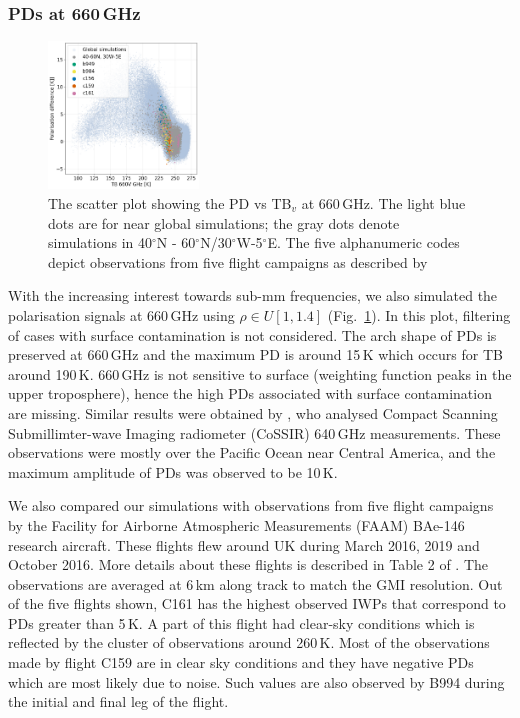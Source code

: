 \documentclass[amt, manuscript]{copernicus}
\begin{document}
\subsubsection{PDs at 660\,GHz}
%
\label{sec:submm_pd}
\begin{figure}[t]
	\includegraphics[width=4cm]{Figures/PD_660.png}
	\caption{The scatter plot showing the PD vs TB$_v$ at 660\,GHz. The light blue dots are for near global simulations; the gray dots denote simulations in 40$^{\circ}$N - 60$^{\circ}$N/30$^{\circ}$W-5$^{\circ}$E. The five alphanumeric codes depict observations from five flight campaigns as described by \citet{fox2020evaluation}}
	\label{fig:PD_660}
\end{figure}

With the increasing interest towards sub-mm frequencies, we also simulated the polarisation signals at 660\,GHz using $\rho\in U[1, 1.4]$ (Fig.~\ref{fig:PD_660}). In this plot, filtering of cases with surface contamination is not considered. The arch shape of PDs is preserved at 660\,GHz and the maximum PD is around 15\,K which occurs for TB around 190\,K. 660\,GHz is not sensitive to surface (weighting function peaks in the upper troposphere), hence the high PDs associated with surface contamination are missing. Similar results were obtained by \citet{gong:micro:17}, who analysed Compact Scanning Submillimter-wave Imaging radiometer (CoSSIR) 640\,GHz measurements. These observations were mostly over the Pacific Ocean near Central America, and the maximum amplitude of PDs was observed to be 10\,K.

We also compared our simulations with observations from five flight campaigns by the Facility for Airborne Atmospheric Measurements (FAAM) BAe-146 research aircraft. These flights flew around UK during March 2016, 2019 and October 2016. More details about these flights is described in Table 2 of \citet{fox2020evaluation}. The observations are averaged at 6\,km along track to match the GMI resolution. Out of the five flights shown, C161 has the highest observed IWPs that correspond to PDs greater than 5\,K. A part of this flight had clear-sky conditions which is reflected by the cluster of observations around 260\,K. Most of the observations made by flight C159 are in clear sky conditions \citep{fox2020evaluation} and they have negative PDs which are most likely due to noise. Such values are also observed by B994 during the initial and final leg of the flight. 
\end{document}
